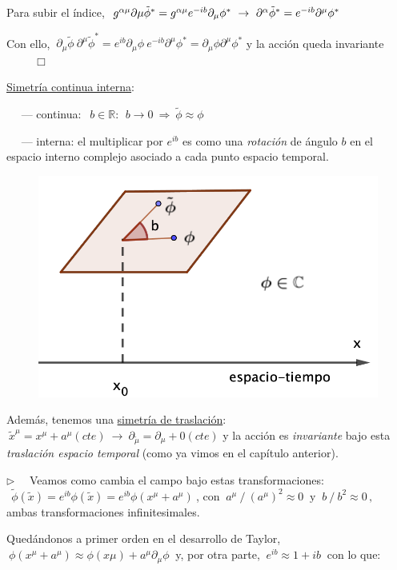 \hspace{1cm} Para subir el índice, $\ g^{\alpha \mu}\partial\-\mu \tilde \phi^* = g^{\alpha \mu} e^{-ib} \partial_\mu \phi^* \ \to \ \partial^\alpha \tilde \phi^* = e^{-ib} \partial^\mu \phi^*$

\hspace{1cm} Con ello, $\ \partial_\mu \tilde \phi \ \partial^\mu \tilde \phi^*=e^{ib} \partial_\mu \phi \ e^{-ib} \partial^\mu \phi^*=\partial_\mu \phi \partial^\mu \phi^*$ 
\hspace{1cm} y la acción queda invariante $\qquad \ \ \Box$

\vspace{5mm}
\begin{multicols}{2}
\underline{Simetría continua interna}:

$\quad$ --- continua: $\ \ b\in \mathbb R:\ \ b \to 0 \ \Rightarrow \  \tilde \phi \approx \phi$

$\quad$ --- interna: el multiplicar por $e^{ib}$ es como una \emph{rotación} de ángulo $b$ en el espacio interno complejo asociado a cada punto espacio temporal.

\begin{figure}[H]
	\centering
	\includegraphics[width=.4\textwidth]{imagenes/img35-02.png}
\end{figure}
\end{multicols}

Además, tenemos una \underline{simetría de traslación}: $\ \tilde x^\mu=x^\mu+a^\mu (cte) \ \to \ \partial_{\tilde \mu}=\partial_\mu + 0 (cte)$ y la acción es \emph{invariante} bajo esta \emph{traslación espacio temporal} (como ya vimos en el capítulo anterior). 


$\triangleright \quad$ Veamos como cambia el campo bajo estas transformaciones:
$\ \  \tilde \phi(\tilde x)=e^{ib} \phi(\tilde x) = e^{ib} \phi(x^\mu+a^\mu)\ $, con $\ a^\mu\ / \ (a^\mu)^2\approx 0 \ \text{ y } \ b\ /\ b^2\approx 0\, , \ $ ambas transformaciones infinitesimales.

Quedándonos a primer orden en el desarrollo de Taylor, $\ \phi(x^\mu + a^\mu) \approx \phi(x\mu)+a^\mu \partial_\mu \phi \ $ y, por otra parte, $\ e^{ib} \approx 1+ib\ $ con lo que:

